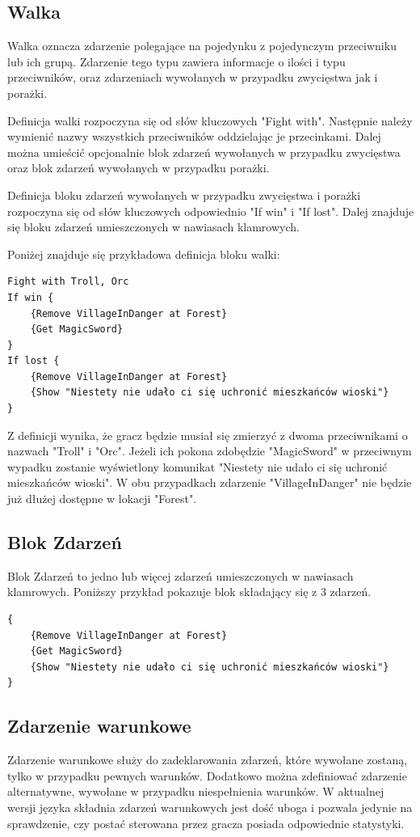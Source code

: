\documentclass	{xmgr}
\begin{document}
\subsection*{Walka}
Walka oznacza zdarzenie polegające na pojedynku z pojedynczym przeciwniku lub ich grupą. Zdarzenie tego typu zawiera informacje o ilości i typu przeciwników, oraz zdarzeniach wywołanych w przypadku zwycięstwa jak i porażki.

Definicja walki rozpoczyna się od słów kluczowych "Fight with". Następnie należy wymienić nazwy wszystkich przeciwników oddzielając je przecinkami. Dalej można umieścić opcjonalnie blok zdarzeń wywołanych w przypadku zwycięstwa oraz blok zdarzeń wywołanych w przypadku porażki.

Definicja bloku zdarzeń wywołanych w przypadku zwycięstwa i porażki rozpoczyna się od słów kluczowych odpowiednio "If win" i "If lost". Dalej znajduje się bloku zdarzeń umieszczonych w nawiasach klamrowych.

Poniżej znajduje się przykładowa definicja bloku walki:
\begin{lstlisting}
Fight with Troll, Orc
If win {
	{Remove VillageInDanger at Forest}
	{Get MagicSword}
}
If lost {
	{Remove VillageInDanger at Forest}
	{Show "Niestety nie udało ci się uchronić mieszkańców wioski"}
}
\end{lstlisting}
Z definicji wynika, że gracz będzie musiał się zmierzyć z dwoma przeciwnikami o nazwach "Troll" i "Orc". Jeżeli ich pokona zdobędzie "MagicSword" w przeciwnym wypadku zostanie wyświetlony komunikat "Niestety nie udało ci się uchronić mieszkańców wioski". W obu przypadkach zdarzenie "VillageInDanger" nie będzie już dłużej dostępne w lokacji "Forest".

\subsection*{Blok Zdarzeń}
Blok Zdarzeń to jedno lub więcej zdarzeń umieszczonych w nawiasach klamrowych.
Poniższy przykład pokazuje blok składający się z 3 zdarzeń.
\begin{lstlisting}
{
	{Remove VillageInDanger at Forest}
	{Get MagicSword}
	{Show "Niestety nie udało ci się uchronić mieszkańców wioski"}
}
\end{lstlisting}

\subsection*{Zdarzenie warunkowe}
Zdarzenie warunkowe służy do zadeklarowania zdarzeń, które wywołane zostaną, tylko w przypadku pewnych warunków. Dodatkowo można zdefiniować zdarzenie alternatywne, wywołane w przypadku niespełnienia warunków.
W aktualnej wersji języka składnia zdarzeń warunkowych jest dość uboga i pozwala jedynie na sprawdzenie, czy postać sterowana przez gracza posiada odpowiednie statystyki.
\end{document}
